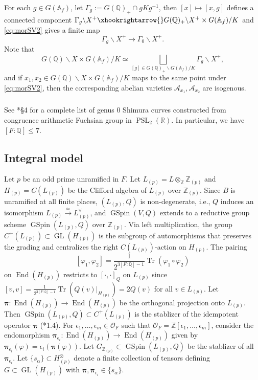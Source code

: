 \documentclass{amsart}
\numberwithin{equation}{subsection}
\numberwithin{theorem}{section}
\theoremstyle{definition}
\theoremstyle{remark}
\newcommand{\bA}{\mathbb{A}}
\newcommand{\bQ}{\mathbb{Q}}
\newcommand{\bR}{\mathbb{R}}
\newcommand{\bZ}{\mathbb{Z}}
\newcommand{\cA}{\mathcal{A}}
\DeclareMathOperator{\GL}{GL}
\DeclareMathOperator{\PSL}{PSL}
\DeclareMathOperator{\GSpin}{GSpin}
\DeclareMathOperator{\Tr}{Tr}
\DeclareMathOperator{\End}{End}
\begin{document}
For each $g\in G(\bA_f)$, let $\Gamma_g := G(\bQ)_+\cap gKg^{-1}$, then $[x]\mapsto [x,g]$ defines a connected component $\Gamma_g\backslash X^+ \xhookrightarrow{} G(\bQ)_+\backslash X^+\times G(\bA_f)/K$ and \eqref{eq:morSV2} gives a finite map \begin{equation}\label{eq:connmorSV2}
    \Gamma_g\backslash X^+ \to \Gamma_0 \backslash X^+ .
\end{equation}
Note that \[G(\bQ)\backslash X\times G(\bA_f)/K\simeq \bigsqcup_{[g] \in G(\bQ)_+\backslash G(\bA_f)/K}\Gamma_g\backslash X^+,\] and
if $x_1, x_2\in G(\bQ)\backslash X\times G(\bA_f)/K$ maps to the same point under \eqref{eq:morSV2}, 
then the corresponding abelian varieties $\cA_{x_1}, \cA_{x_2}$ are isogenous. 

\subsubsection{}
See \cite{MR2476577}*{\S4} for a complete list of genus $0$ Shimura curves constructed from congruence arithmetic Fuchsian group in $\PSL_2(\bR)$.
In particular, we have $[F:\bQ] \leq 7$. 

\subsection{Integral model}

Let $p$ be an odd prime unramified in $F$. Let $L_{(p)} = L\otimes_{\bZ} \bZ_{(p)}$ and $H_{(p)} = C(L_{(p)})$ be the Clifford algebra of $L_{(p)}$ over $\bZ_{(p)}$. Since $B$ is unramified at all finite places, $(L_{(p)}, Q)$ is non-degenerate, i.e., $Q$ induces an isomorphism $L_{(p)} \xrightarrow{\simeq} L_{(p)}^\vee$, and $\GSpin(V,Q)$ extends to a reductive group scheme $\GSpin(L_{(p)}, Q)$ over $\bZ_{(p)}$. 
Via left multiplication, the group $C^+(L_{(p)}) \subset \GL(H_{(p)})$ is the subgroup of automorphisms that preserves the grading and centralizes the right $C(L_{(p)})$-action on $H_{(p)}$.
The pairing \[[\varphi_1,\varphi_2] = \frac{1}{2^{3[F:\bQ]-1}}\Tr(\varphi_1\circ \varphi_2)\] on $\End(H_{(p)})$ restricts to $[\cdot, \cdot]_Q$ on $L_{(p)}$ since $[v,v] = \frac{1}{2^{3[F:\bQ]-1}} \Tr(Q(v)|_{H_{(p)}}) = 2Q(v)$ for all $v\in L_{(p)}$. Let $\bm{\pi}: \End(H_{(p)}) \to \End(H_{(p)})$ be the orthogonal projection onto $L_{(p)}$. Then $\GSpin(L_{(p)}, Q) \subset C^+(L_{(p)})$ is the stablizer of the idempotent operator $\bm{\pi}$ (\cite{MR3484114}*{1.4}).
For $\epsilon_1, \dotsc,\epsilon_m \in \mathcal{O}_F$ such that $\mathcal{O}_F = \bZ[\epsilon_1, \dotsc, \epsilon_m]$, consider the endomorphism $\bm{\pi}_{\epsilon_i}: \End(H_{(p)}) \to \End(H_{(p)})$ given by $\bm{\pi}_{{\epsilon_i}}(\varphi) = {\epsilon_i}(\bm{\pi}(\varphi))$. Let $G_{\bZ_{(p)}}\subset \GSpin(L_{(p)}, Q)$ be the stablizer of all $\bm{\pi}_{\epsilon_i}$. Let $\{s_{\alpha}\} \subset H_{(p)}^{\otimes}$ denote a finite collection of tensors defining $G\subset \GL(H_{(p)})$ with $\bm{\pi}, \bm{\pi}_{\epsilon_i} \in \{s_{\alpha}\}$. 
\end{document}
